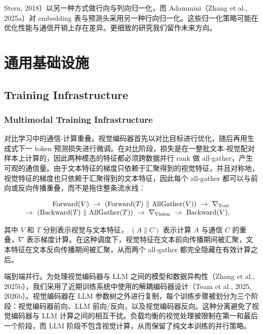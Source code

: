 \documentclass[
  10
]{article}
\begin{document}
Stern, 2018）以另一种方式做行向与列向归一化，而 Adammini（Zhang et al., 2025a）对 embedding 表与预测头采用另一种行向归一化。这些归一化策略可能在优化性能与通信开销上存在差异。更细致的研究我们留作未来方向。
\section{通用基础设施}\label{general-infrastructures}

\subsection{Training Infrastructure}\label{training-infrastructure}

\subsubsection{Multimodal Training Infrastructure}\label{multimodal-training-infrastructure}

对比学习中的通信-计算重叠。视觉编码器首先以对比目标进行优化，随后再用生成式下一 token 预测损失进行微调。在对比阶段，损失是在一整批文本-视觉配对样本上计算的，因此两种模态的特征都必须跨数据并行 rank 做 all-gather，产生可观的通信量。由于文本特征的梯度只依赖于汇聚得到的视觉特征，并且对称地，视觉特征的梯度也只依赖于汇聚得到的文本特征，因此每个 all-gather 都可以与前向或反向传播重叠，而不是拖住整条流水线：

\[
\begin{array} { r l } { \mathrm { F o r w a r d } ( V ) ~ \to ~ \left( \mathrm { F o r w a r d } ( T ) ~ \lVert ~ \mathrm { A l l G a t h e r } ( V ) \right) ~ \to ~ \nabla _ { \mathrm { T e x t } } } & { } \\ { \to ~ \left( \mathrm { B a c k w a r d } ( T ) ~ \lVert ~ \mathrm { A l l G a t h e r } ( T ) \right) ~ \to ~ \nabla _ { \mathrm { V i s i o n } } ~ \to ~ \mathrm { B a c k w a r d } ( V ) , } \end{array}
\]

其中 $V$ 和 $T$ 分别表示视觉与文本特征，
\(\left( A \parallel C \right)\) 表示计算 $A$ 与通信 \(C\) 的重叠，$\nabla$ 表示梯度计算。在这种调度下，视觉特征在文本前向传播期间被汇聚，文本特征在文本反向传播期间被汇聚，从而两个 all-gather 都完全隐藏在有效计算之后。



端到端并行。为处理视觉编码器与 LLM 之间的模型和数据异构性（Zhang et al., 2025b），我们采用了近期训练系统中使用的解耦编码器设计（Team et al., 2025, 2026b）。视觉编码器在 LLM 参数树之外进行复制，每个训练步骤被划分为三个阶段：视觉编码器前向、LLM 前向/反向，以及视觉编码器反向。这种分离避免了视觉编码器与 LLM 计算之间的相互干扰。负载均衡的视觉处理被限制在第一和最后一个阶段，而 LLM 阶段不包含视觉计算，从而保留了纯文本训练的并行策略。
\end{document}
